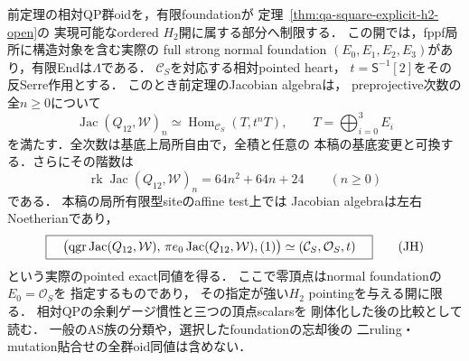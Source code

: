 \begin{theorem}
\label{thm:qa-two-mass-h2-locus-jacobian-heart}
前定理の相対QP群oidを，有限foundationが
定理~\ref{thm:qa-square-explicit-h2-open}の
実現可能なordered $H_2$開に属する部分へ制限する．
この開では，fppf局所に構造対象を含む実際の
full strong normal foundation
$(E_0,E_1,E_2,E_3)$があり，有限Endは$\Lambda$である．
$\mathcal C_S$を対応する相対pointed heart，
$t=\mathsf S^{-1}[2]$をその反Serre作用とする．
このとき前定理のJacobian algebraは，
preprojective次数の全$n\geq0$について
\[
 \operatorname{Jac}(Q_{12},\mathcal W)_n
 \simeq
 \operatorname{Hom}_{\mathcal C_S}
       (T,t^nT),\qquad T=\bigoplus_{i=0}^3E_i
 \tag{SH}\label{eq:qa-two-mass-jacobian-serre-orbit}
\]
を満たす．全次数は基底上局所自由で，全積と任意の
本稿の基底変更と可換する．さらにその階数は
\[
 \operatorname{rk}\operatorname{Jac}(Q_{12},\mathcal W)_n
   =64n^2+64n+24\qquad(n\ge0)
 \tag{Hilb}\label{eq:qa-two-mass-jacobian-hilbert-ranks}
\]
である．
本稿の局所有限型siteのaffine test上では
Jacobian algebraは左右Noetherianであり，
\[
 \boxed{\quad
 \bigl(\operatorname{qgr}\operatorname{Jac}(Q_{12},\mathcal W),
       \,\pi e_0\operatorname{Jac}(Q_{12},\mathcal W),(1)\bigr)
 \simeq(\mathcal C_S,\mathcal O_S,t)
 \quad}
 \tag{JH}\label{eq:qa-two-mass-jacobian-pointed-heart}
\]
という実際のpointed exact同値を得る．
ここで零頂点はnormal foundationの$E_0=\mathcal O_S$を
指定するものであり，
その指定が強い$H_2$ pointingを与える開に限る．
相対QPの余剰ゲージ慣性と三つの頂点scalarsを
剛体化した後の比較として読む．
一般のAS族の分類や，選択したfoundationの忘却後の
二ruling・mutation貼合せの全群oid同値は含めない．
\end{theorem}
